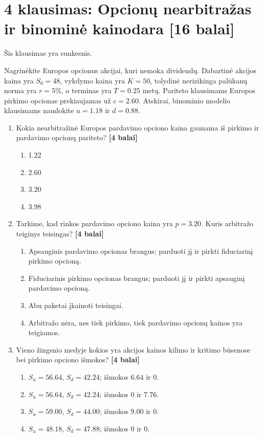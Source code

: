 \documentclass[11pt]{article}
\newcommand{\pts}[1]{\hspace{0.35em}\textnormal{\textbf{[#1 balai]}}}
\newenvironment{choices}{\begin{enumerate}[label=\Alph*.,leftmargin=2.2em,itemsep=0.12em,topsep=0.12em]}{\end{enumerate}}
\begin{document}
\section*{4 klausimas: Opcionų nearbitražas ir binominė kainodara \pts{16}}

Šis klausimas yra sunkesnis.

Nagrinėkite Europos opcionus akcijai, kuri nemoka dividendų. Dabartinė akcijos
kaina yra $S_0=48$, vykdymo kaina yra $K=50$, tolydinė nerizikinga palūkanų norma
yra $r=5\%$, o terminas yra $T=0.25$ metų. Pariteto klausimams Europos pirkimo
opcionas prekiaujamas už $c=2.60$. Atskirai, binominio modelio klausimams
naudokite $u=1.18$ ir $d=0.88$.

\begin{enumerate}
    \item Kokia nearbitražinė Europos pardavimo opciono kaina gaunama iš pirkimo
    ir pardavimo opcionų pariteto? \pts{4}
    \begin{choices}
        \item 1.22
        \item 2.60
        \item 3.20
        \item 3.98
    \end{choices}

    \item Tarkime, kad rinkos pardavimo opciono kaina yra $p=3.20$. Kuris
    arbitražo teiginys teisingas? \pts{4}
    \begin{choices}
        \item Apsauginis pardavimo opcionas brangus; parduoti jį ir pirkti
        fiduciarinį pirkimo opcioną.
        \item Fiduciarinis pirkimo opcionas brangus; parduoti jį ir pirkti
        apsauginį pardavimo opcioną.
        \item Abu paketai įkainoti teisingai.
        \item Arbitražo nėra, nes tiek pirkimo, tiek pardavimo opcionų kainos yra
        teigiamos.
    \end{choices}

    \item Vieno žingsnio medyje kokios yra akcijos kainos kilimo ir kritimo
    būsenose bei pirkimo opciono išmokos? \pts{4}
    \begin{choices}
        \item $S_u=56.64$, $S_d=42.24$; išmokos $6.64$ ir $0$.
        \item $S_u=56.64$, $S_d=42.24$; išmokos $0$ ir $7.76$.
        \item $S_u=59.00$, $S_d=44.00$; išmokos $9.00$ ir $0$.
        \item $S_u=48.18$, $S_d=47.88$; išmokos $0$ ir $0$.
    \end{choices}


\end{enumerate}
\end{document}
